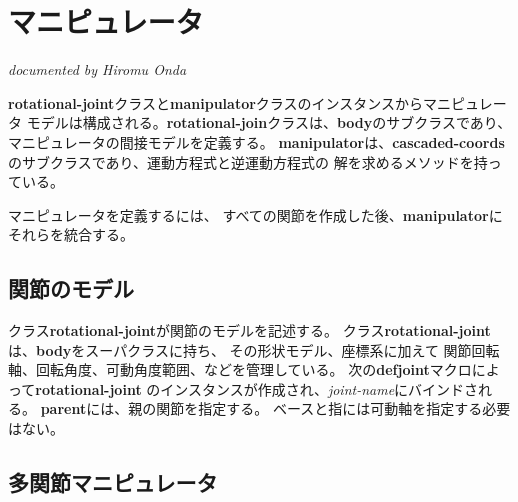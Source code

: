 \section{\label{ManipulatorModel}マニピュレータ}
\hfill {\em documented by Hiromu Onda}

{\bf rotational-joint}クラスと{\bf manipulator}クラスのインスタンスからマニピュレータ
モデルは構成される。{\bf rotational-join}クラスは、{\bf body}のサブクラスであり、
マニピュレータの間接モデルを定義する。
{\bf manipulator}は、{\bf cascaded-coords}のサブクラスであり、運動方程式と逆運動方程式の
解を求めるメソッドを持っている。

マニピュレータを定義するには、
すべての関節を作成した後、{\bf manipulator}にそれらを統合する。

\subsection{
関節のモデル}

クラス{\bf rotational-joint}が関節のモデルを記述する。
クラス{\bf rotational-joint}は、{\bf body}をスーパクラスに持ち、
その形状モデル、座標系に加えて
関節回転軸、回転角度、可動角度範囲、などを管理している。
次の{\bf defjoint}マクロによって{\bf rotational-joint}
のインスタンスが作成され、{\em joint-name}にバインドされる。
{\bf parent}には、親の関節を指定する。
ベースと指には可動軸を指定する必要はない。

\begin{refdesc}
\end{refdesc}

\subsection{
多関節マニピュレータ}

